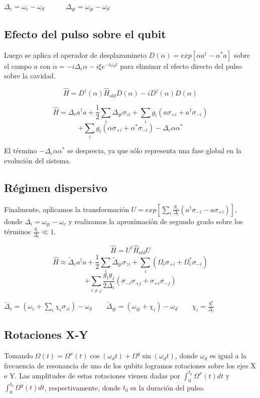 $\Delta_c = \omega_c - \omega_d \qquad \quad \Delta_{qi} = \omega_{qi} - \omega_d$

\subsection{Efecto del pulso sobre el qubit}

Luego se aplica el operador de desplazamineto $D(\alpha) = exp[\alpha a^\dagger - \alpha^* a]$ sobre el campo $a$ con $\dot{\alpha} = -i \Delta_c \alpha -i \xi e^{-i \omega_d t}$ para eliminar el efecto directo del pulso sobre la cavidad.

$$\hat{H} = D^\dagger (\alpha) \hat{H}_{old} D(\alpha) -i D^\dagger(\alpha) \dot{D}(\alpha)$$

$$\hat{H} = \Delta_c a^\dagger a + \frac{1}{2} \sum\limits_i \Delta_{qi} \sigma_{zi} + \sum\limits_i g_i (a \sigma_{+i} + a^\dagger \sigma_{-i})$$
$$ + \sum\limits_i g_i (\alpha \sigma_{+i} + \alpha^* \sigma_{-i}) - \Delta_c \alpha \alpha^* $$

El término $-\Delta_c \alpha \alpha^*$ se desprecia, ya que sólo representa una fase global en la evolución del sistema.

\subsection{Régimen dispersivo}

Finalmente, aplicamos la transformación $U = exp[\sum\limits_i \frac{g_i} {\Delta_i} (a^\dagger \sigma_{-i} - a \sigma_{+i})]$, donde $\Delta_i = \omega_{qi} - \omega_c$ y realizamos la aproximación de segundo grado sobre los términos $\frac{g_i}{\Delta_i} \ll 1$.

$$\hat{H} = U^\dagger \hat{H}_{old} U$$
$$\hat{H} \approx \tilde{\Delta}_c a^\dagger a + \frac{1}{2} \sum\limits_i \tilde{\Delta}_{qi} \sigma_{zi} + \sum\limits_i (\Omega_i \sigma_{+i} + \Omega_i^* \sigma_{-i})$$
$$+ \sum\limits_{i \neq j} \frac{g_i g_j}{2 \Delta_i} (\sigma_{-i} \sigma_{+j}+\sigma_{+i} \sigma_{-j})$$

$\tilde{\Delta}_c = (\omega_c + \sum\limits_i \chi_i \sigma_{zi}) - \omega_d
 \qquad
 \tilde{\Delta}_{qi} = (\omega_{qi} + \chi_i) - \omega_d
 \qquad
 \chi_i = \frac{g_i^2}{\Delta_i}$

\subsection{Rotaciones X-Y}

Tomando $\Omega(t) = \Omega^x(t) \cos(\omega_d t) + \Omega^y \sin(\omega_d t)$, donde $\omega_d$ es igual a la frecuencia de resonancia de uno de los qubits logramos rotaciones sobre los ejes X e Y. Las amplitudes de estas rotaciones vienen dadas por $\int_0^{t_0} \Omega^x(t) dt$ y $\int_0^{t_0} \Omega^y(t) dt$, respectivamente, donde $t_0$ es la duración del pulso.

